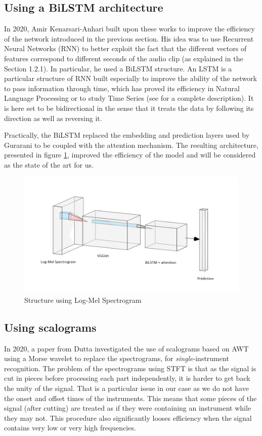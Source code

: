 \documentclass[final]{cvpr}
\begin{document}
\subsection{Using a BiLSTM architecture}
In 2020, Amir Kenarsari-Anhari \cite{squelette_progr} built upon these works to improve the efficiency of the network introduced in the previous section. His idea was to use Recurrent Neural Networks (RNN) to better exploit the fact that the different vectors of features correspond to different seconds of the audio clip (as explained in the Section 1.2.1). In particular, he used a BiLSTM structure. An LSTM is a particular structure of RNN built especially to improve the ability of the network to pass information through time, which has proved its efficiency in Natural Language Processing or to study Time Series (see \cite{lstm} for a complete description). It is here set to be bidirectional in the sense that it treats the data by following its direction as well as reversing it.

Practically, the BiLSTM replaced the embedding and prediction layers used by Gurarani \etal to be coupled with the attention mechanism. The resulting architecture, presented in figure \ref{mel}, improved the efficiency of the model and will be considered as the state of the art for us. 
\begin{figure}
	\centering
	\includegraphics[scale = 0.45]{bilstm.png}
	\caption{Structure using Log-Mel Spectrogram}
	\label{mel}
\end{figure}
\subsection{Using scalograms}
In 2020, a paper from Dutta \etal \cite{features_descr} investigated the use of scalograms based on AWT using a Morse wavelet to replace the spectrograms, for \textit{single}-instrument recognition. The problem of the spectrograms using STFT is that as the signal is cut in pieces before processing each part independently, it is harder to get back the unity of the signal. That is a particular issue in our case as we do not have the onset and offset times of the instruments. This means that some pieces of the signal (after cutting) are treated as if they were containing an instrument while they may not. This procedure also significantly looses efficiency when the signal contains very low or very high frequencies. 
\end{document}
